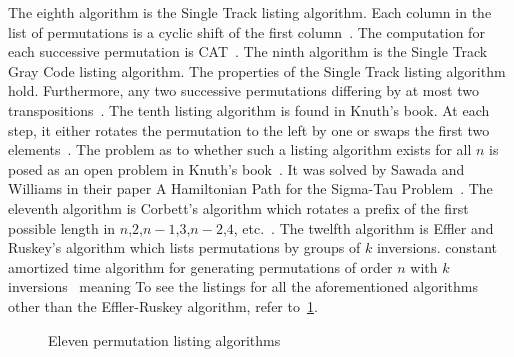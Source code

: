 The eighth algorithm is the Single Track listing algorithm. Each column in the list of permutations 
is a cyclic shift of the first column~\cite{A36}. The computation for each successive permutation 
is CAT~\cite{A36}.
The ninth algorithm is the Single Track Gray Code listing algorithm. The properties of the Single Track 
listing algorithm hold. Furthermore, any two successive permutations differing by at most two transpositions~\cite{A36}.
The tenth listing algorithm is found in Knuth's book. At each step, it either rotates the permutation to the left by one 
or swaps the first two elements~\cite{A37}. The problem as to whether such a listing algorithm exists for all $n$ 
is posed as an open problem in Knuth's book~\cite{A37}. It was solved by Sawada and Williams in their paper 
A Hamiltonian Path for the Sigma-Tau Problem~\cite{A38}.
The eleventh algorithm is Corbett's algorithm which rotates a prefix of the first possible length in 
$n$,$2$,$n-1$,$3$,$n-2$,$4$, etc.~\cite{A34}. 
The twelfth algorithm is Effler and Ruskey's algorithm which lists permutations by groups of $k$ inversions. %
constant amortized time algorithm for generating permutations of order $n$ with $k$ inversions~\cite{A26} meaning 
To see the listings for all the aforementioned algorithms other than the Effler-Ruskey algorithm, refer to~\ref{Fig:11perms}.\par
\begin{figure} 
    \centering 
    \caption{Eleven permutation listing algorithms}
    \label{Fig:11perms}
\end{figure}

